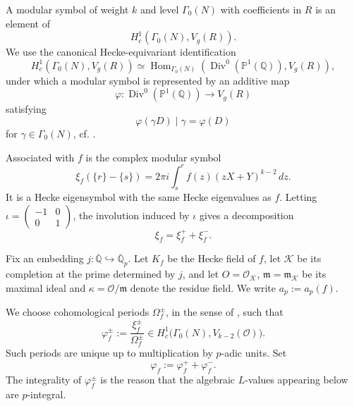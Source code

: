\documentclass[11pt,table]{amsart}
\newcommand{\Q}{\mathbb{Q}}
\numberwithin{equation}{section}
\begin{document}
\par A modular symbol of weight \(k\) and level \(\Gamma_0(N)\) with
coefficients in \(R\) is an element of
\[
        H_c^1(\Gamma_0(N),V_g(R)).
\]
We use the canonical Hecke-equivariant identification
\begin{equation}
\label{basic mod symbol iso}
        H_c^1(\Gamma_0(N),V_g(R))
        \simeq
        \operatorname{Hom}_{\Gamma_0(N)}
        \left(
        \operatorname{Div}^0(\mathbb{P}^1(\Q)),
        V_g(R)
        \right),
\end{equation}
under which a modular symbol is represented by an additive map
\[
        \varphi:
        \operatorname{Div}^0(\mathbb{P}^1(\Q))
        \longrightarrow
        V_g(R)
\]
satisfying
\[
        \varphi(\gamma D)\mid\gamma
        =
        \varphi(D)
\]
for $\gamma\in\Gamma_0(N)$, cf. \cite[Proposition~4.2]{AshStevens}.

\par Associated with \(f\) is the complex modular symbol
\begin{equation}\label{complexmodsym}\xi_f(\{r\}-\{s\})
        =
        2\pi i
        \int_s^r
        f(z)(zX+Y)^{k-2}\,dz.
\end{equation}
It is a Hecke eigensymbol with the same Hecke eigenvalues as \(f\).
Letting $\iota
        =
        \begin{pmatrix}
        -1&0\\0&1
        \end{pmatrix}$, the involution induced by \(\iota\) gives a decomposition
\[
        \xi_f=\xi_f^++\xi_f^-.
\]

\par Fix an embedding $j:\overline{\Q}\hookrightarrow\overline{\Q}_p$. Let \(K_f\) be the Hecke field of \(f\), let \(\mathcal K\) be its
completion at the prime determined by \(j\), and let $O=\mathcal O_{\mathcal K}$, $\mathfrak m=\mathfrak m_{\mathcal K}$ be its maximal ideal and $\kappa=\mathcal O/\mathfrak m$ denote the residue field.
We write $a_p:=a_p(f)$.

\par We choose cohomological periods \(\Omega_f^\pm\), in the sense of
\cite[Definition~2.1]{PollackWeston}, such that
\[
        \varphi_f^\pm
        :=
        \frac{\xi_f^\pm}{\Omega_f^\pm}
        \in
        H_c^1
        \bigl(
        \Gamma_0(N),V_{k-2}(\mathcal O)
        \bigr).
\]
Such periods are unique up to multiplication by \(p\)-adic units.
Set
\[
        \varphi_f:=\varphi_f^++\varphi_f^-.
\]
The integrality of \(\varphi_f^\pm\) is the reason that the algebraic
\(L\)-values appearing below are \(p\)-integral.
\end{document}
